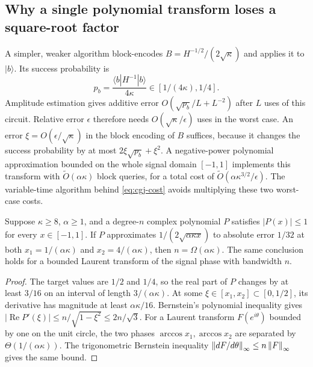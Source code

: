 \subsection{Why a single polynomial transform loses a square-root factor}

A simpler, weaker algorithm block-encodes
$B=H^{-1/2}/(2\sqrt\kappa)$ and applies it to $|b\rangle$.  Its
success probability is
\[
 p_b=\frac{\langle b|H^{-1}|b\rangle}{4\kappa}
 \in[1/(4\kappa),1/4].
\]
Amplitude estimation \citep{BrassardEtAl2002} gives additive error
$O(\sqrt{p_b}/L+L^{-2})$ after $L$ uses of this circuit.  Relative error
$\epsilon$ therefore needs $O(\sqrt\kappa/\epsilon)$ uses in the worst
case.  An error $\xi=O(\epsilon/\sqrt\kappa)$ in the block encoding of $B$
suffices, because it changes the success probability by at most
$2\xi\sqrt{p_b}+\xi^2$.  A negative-power polynomial approximation
bounded on the whole signal domain $[-1,1]$ \citep{GilyenEtAl2019}
implements this transform with $\widetilde O(\alpha\kappa)$ block queries,
for a total cost of $\widetilde O(\alpha\kappa^{3/2}/\epsilon)$.
The variable-time algorithm behind \eqref{eq:cgj-cost} avoids
multiplying these two worst-case costs.

\begin{proposition}\label{prop:bounded-transform}
Suppose $\kappa\geq8$, $\alpha\geq1$, and a degree-$n$ complex polynomial
$P$ satisfies $|P(x)|\leq1$ for every $x\in[-1,1]$.  If $P$ approximates
$1/(2\sqrt{\alpha\kappa x})$ to absolute error $1/32$ at both
$x_1=1/(\alpha\kappa)$ and $x_2=4/(\alpha\kappa)$, then
$n=\Omega(\alpha\kappa)$.
The same conclusion holds for a bounded Laurent transform of the signal
phase with bandwidth $n$.
\end{proposition}

\begin{proof}
The target values are $1/2$ and $1/4$, so the real part of $P$ changes
by at least $3/16$ on an interval of length $3/(\alpha\kappa)$.
At some $\xi\in[x_1,x_2]\subset[0,1/2]$, its derivative has magnitude
at least $\alpha\kappa/16$.  Bernstein's polynomial inequality gives
$|\operatorname{Re}P'(\xi)|\leq n/\sqrt{1-\xi^2}\leq2n/\sqrt3$.
For a Laurent transform $F(e^{i\theta})$ bounded by one on the unit
circle, the two phases $\arccos x_1,\arccos x_2$ are separated by
$\Theta(1/(\alpha\kappa))$.  The trigonometric Bernstein inequality
$\left\lVert dF/d\theta\right\rVert_\infty\leq n\left\lVert F\right\rVert_\infty$ gives the same bound.
\end{proof}

